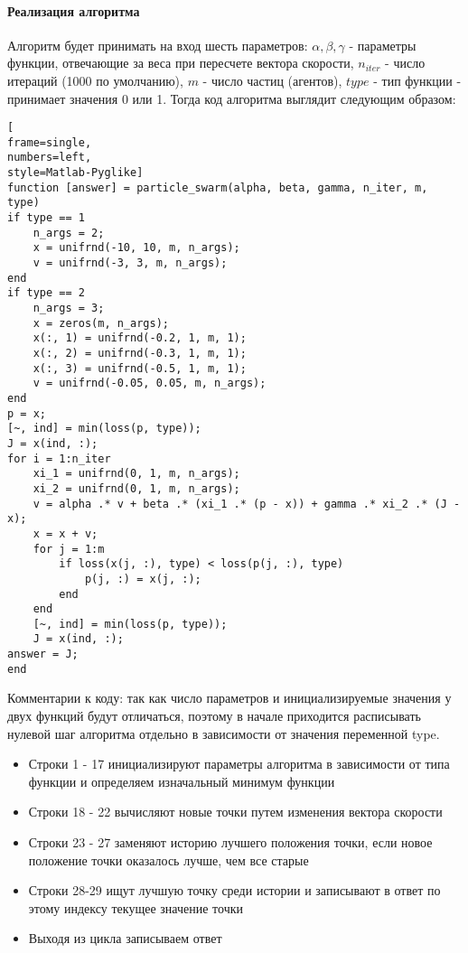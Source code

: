 \documentclass[12pt]{article}
\begin{document}
\paragraph{Реализация алгоритма}
Алгоритм будет принимать на вход шесть параметров: $\alpha, \beta, \gamma$ - параметры функции, отвечающие за веса при пересчете вектора скорости, $n_{iter}$ - число итераций (1000 по умолчанию), $m$ - число частиц (агентов), $type$ - тип функции - принимает значения 0 или 1.  Тогда код алгоритма выглядит следующим образом:
\begin{lstlisting}[
frame=single,
numbers=left,
style=Matlab-Pyglike]
function [answer] = particle_swarm(alpha, beta, gamma, n_iter, m, type)
if type == 1
    n_args = 2;
    x = unifrnd(-10, 10, m, n_args);
    v = unifrnd(-3, 3, m, n_args);
end
if type == 2
    n_args = 3;
    x = zeros(m, n_args);
    x(:, 1) = unifrnd(-0.2, 1, m, 1);
    x(:, 2) = unifrnd(-0.3, 1, m, 1);
    x(:, 3) = unifrnd(-0.5, 1, m, 1);
    v = unifrnd(-0.05, 0.05, m, n_args);
end
p = x;
[~, ind] = min(loss(p, type));
J = x(ind, :);
for i = 1:n_iter
    xi_1 = unifrnd(0, 1, m, n_args);
    xi_2 = unifrnd(0, 1, m, n_args);
    v = alpha .* v + beta .* (xi_1 .* (p - x)) + gamma .* xi_2 .* (J - x);
    x = x + v;
    for j = 1:m
        if loss(x(j, :), type) < loss(p(j, :), type)
            p(j, :) = x(j, :);
        end
    end
    [~, ind] = min(loss(p, type));
    J = x(ind, :);
answer = J;
end

\end{lstlisting}
Комментарии к коду: так как число параметров и инициализируемые значения у двух функций будут отличаться, поэтому в начале приходится расписывать нулевой шаг алгоритма отдельно в зависимости от значения переменной type. 
\begin{itemize}
	\item Строки 1 - 17 инициализируют параметры алгоритма в зависимости от типа функции и определяем изначальный минимум функции
	\item Строки 18 - 22 вычисляют новые точки путем изменения вектора скорости
	\item Строки 23 - 27 заменяют историю лучшего положения точки, если новое положение точки оказалось лучше, чем все старые
	\item Строки 28-29 ищут лучшую точку среди истории и записывают в ответ по этому индексу текущее значение точки
	\item Выходя из цикла записываем ответ
\end{itemize}
\end{document}
